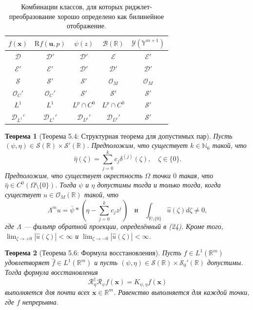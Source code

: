 \documentclass[12pt]{article}
\newtheorem{theorem}{Теорема}
\begin{document}
\begin{table}[h]
	\centering
	\caption{Комбинации классов, для которых риджлет-преобразование хорошо определено как билинейное отображение.}
	\label{tab:balancing}
	\begin{tabular}{ccccc}
		\toprule
		\(f(\mathbf{x})\) & \(\mathrm{R}f(\mathbf{u}, p)\) & \(\psi(z)\) & \(\mathcal{B}(\mathbb{R})\) & \(\mathcal{Y}(\mathbb{Y}^{m+1})\) \\
		\midrule
		\(\mathcal{D}\) & \(\mathcal{D}'\) & \(\mathcal{D}'\) & \(\mathcal{E}\) & \(\mathcal{E}'\) \\
		\(\mathcal{E}'\) & \(\mathcal{E}'\) & \(\mathcal{D}'\) & \(\mathcal{D}'\) & \(\mathcal{D}'\) \\
		\(\mathcal{S}\) & \(\mathcal{S}'\) & \(\mathcal{S}'\) & \(\mathcal{O}_M\) & \(\mathcal{O}_M\) \\
		\(\mathcal{O}_C'\) & \(\mathcal{O}_C'\) & \(\mathcal{S}'\) & \(\mathcal{S}'\) & \(\mathcal{S}'\) \\
		\(L^1\) & \(L^1\) & \(L^p \cap C^0\) & \(L^p \cap C^0\) & \(\mathcal{S}'\) \\
		\(\mathcal{D}_{L^1}'\) & \(\mathcal{D}_{L^1}'\) & \(\mathcal{D}_{L^p}'\) & \(\mathcal{D}_{L^p}'\) & \(\mathcal{S}'\) \\
		\bottomrule
	\end{tabular}
\end{table}

\begin{theorem}[Теорема 5.4: Структурная теорема для допустимых пар]
	Пусть \( (\psi, \eta) \in \mathcal{S}(\mathbb{R}) \times \mathcal{S}'(\mathbb{R}) \). Предположим, что существует \( k \in \mathbb{N}_0 \) такой, что
	\[
	\hat{\eta}(\zeta) = \sum_{j=0}^{k} c_j \delta^{(j)}(\zeta), \quad \zeta \in \{0\}.
	\]
	Предположим, что существует окрестность \( \Omega \) точки \( 0 \) такая, что \( \hat{\eta} \in C^0(\Omega \setminus \{0\}) \). Тогда \( \psi \) и \( \eta \) допустимы тогда и только тогда, когда существует \( u \in \mathcal{O}_M(\mathbb{R}) \) такой, что
	\[
	\Lambda^m u = \bar{\psi} * \left( \eta - \sum_{j=0}^{k} c_j z^j \right) \quad \text{и} \quad \int_{\mathbb{R} \setminus \{0\}} \hat{u}(\zeta) d\zeta \neq 0,
	\]
	где \( \Lambda \) — фильтр обратной проекции, определённый в (24). Кроме того, \( \lim_{\zeta \to +0} |\hat{u}(\zeta)| < \infty \) и \( \lim_{\zeta \to -0} |\hat{u}(\zeta)| < \infty \).
\end{theorem}

\begin{theorem}[Теорема 5.6: Формула восстановления]
	Пусть \( f \in L^1(\mathbb{R}^m) \) удовлетворяет \( \hat{f} \in L^1(\mathbb{R}^m) \) и пусть \( (\psi, \eta) \in \mathcal{S}(\mathbb{R}) \times \mathcal{S}_0'(\mathbb{R}) \) допустимы. Тогда формула восстановления
	\[
	\mathscr{R}_\eta^\dagger \mathscr{R}_\psi f(\mathbf{x}) = K_{\psi, \eta} f(\mathbf{x})
	\]
	выполняется для почти всех \( \mathbf{x} \in \mathbb{R}^m \). Равенство выполняется для каждой точки, где \( f \) непрерывна.
\end{theorem}
\end{document}
